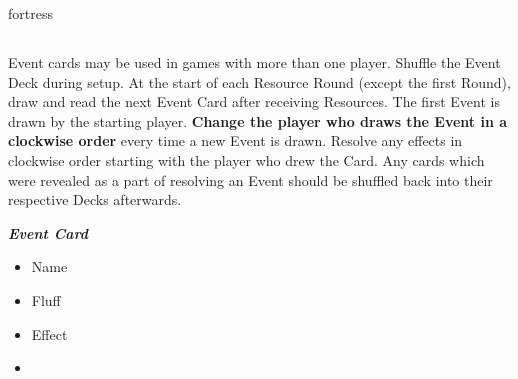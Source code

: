 \begin{multicols*}{2}
\begin{expansion}{fortress}
  \subsection*{}
  Event cards may be used in games with more than one player.
  Shuffle the Event Deck during setup.
  At the start of each Resource Round (except the first Round), draw and read the next Event Card after receiving Resources.
  The first Event is drawn by the starting player.
  \textbf{Change the player who draws the Event in a clockwise order} every time a new Event is drawn.
  Resolve any effects in clockwise order starting with the player who drew the Card.
  Any cards which were revealed as a part of resolving an Event should be shuffled back into their respective Decks afterwards.

  \medskip

  \begin{minipage}[h]{\linewidth}
    \vspace{0.1pt}
    \centering
    \begin{scriptsize}
    \end{scriptsize}
    \footnotesize
    \textbf{\textit{\textcolor{darkcandyapplered}{Event Card}}}
    \begin{multicols}{2}
      \begin{itemize}
        \item[\textbf{1.}] Name
        \item[\textbf{2.}] Fluff
        \item[\textbf{3.}] Effect
        \item[\textbf{\phantom{.}}] \phantom{.}
      \end{itemize}
    \end{multicols}
  \end{minipage}
\end{expansion}

\end{multicols*}
